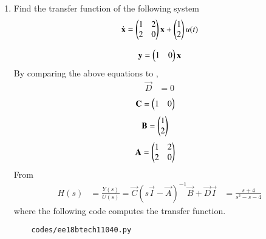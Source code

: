 \begin{enumerate}[label=\thesubsection.\arabic*.,ref=\thesubsection.\theenumi]

\item Find the transfer function of the following system 
%
\begin{align}
    \mathbf{\dot x } = \begin{pmatrix} 1&2\\ 2&0\end{pmatrix} \mathbf{x} + \begin{pmatrix} 1 \\2\end{pmatrix}u(t)   
\end{align}

\begin{align}
    \mathbf{y} = \begin{pmatrix} 1&0\end{pmatrix}\mathbf{x}
\end{align}
%
\solution By comparing the above equations to \label{eq:ee18btech11004_state},
%
\begin{align}
    \Vec{D} &= 0
\end{align}
\begin{align}
    \mathbf{C} &= \begin{pmatrix}1&0\end{pmatrix}
\end{align}
\begin{align}
    \mathbf{B} &= \begin{pmatrix}1\\2\end{pmatrix}
\end{align}
\begin{align}
    \mathbf{A} &= \begin{pmatrix}1&2\\2&0\end{pmatrix}
\end{align}
%
From \label{eq:ee18btech11004_siso}
%
\begin{align}
    H(s) &= \frac{Y(s)}{U(s)} = \vec{C}(s\vec{I} - \vec{A})^{-1} \vec{B} + \vec{D}\vec{I}
   & = \frac{s +4}{s^2 - s - 4}
\end{align}
%
where the following code computes the transfer function. 
\begin{lstlisting}
    codes/ee18btech11040.py
\end{lstlisting}


\end{enumerate}

